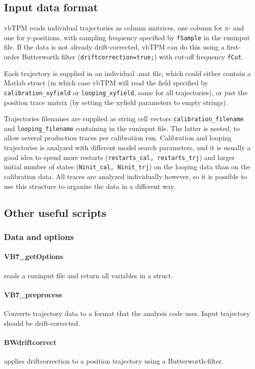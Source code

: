 \subsection{Input data format}
vbTPM reads individual trajectories as column matrices, one column for
x- and one for y-positions, with sampling frequency specified by
\texttt{fSample} in the runinput file. If the data is not already
drift-corrected, vbTPM can do this using a first-order Butterworth
filter (\texttt{driftcorrection=true;}) with cut-off frequency
\texttt{fCut}.

Each trajectory is supplied in an individual .mat file, which could
either contain a Matlab struct (in which case vbTPM will read the
field specified by \texttt{calibration\_xyfield} or
\texttt{looping\_xyfield}, same for all trajectories), or just the
position trace matrix (by setting the xyfield parameters to empty
strings).

Trajectories filenames are supplied as string cell vectors
\texttt{calibration\_filename} and \texttt{looping\_filename}
containing in the runinput file. The latter is nested, to allow
several production traces per calibration run. Calibration and looping
trajectories is analyzed with different model search parameters, and
it is usually a good idea to spend more restarts
(\texttt{restarts\_cal, restarts\_trj}) and larger initial number of
states (\texttt{Ninit\_cal, Ninit\_trj}) on the looping data than on
the calibration data. All traces are analyzed individually however, so
it is possible to use this structure to organize the data in a
different way.

\subsection{Other useful scripts}
\subsubsection{Data and options}
\paragraph{VB7\_getOptions} 
reads a runinput file and return all variables in a struct.
\paragraph{VB7\_preprocess} 
Converts trajectory data to a format that the analysis code
uses. Input trajectory should be drift-corrected.
\paragraph{BWdriftcorrect}
applies driftcorrection to a position trajectory using a Butterworth-filter.
